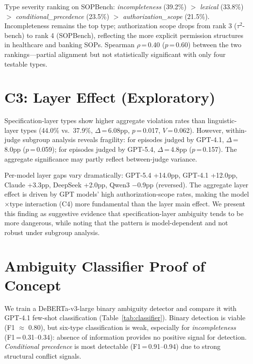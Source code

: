 \documentclass[11pt,a4paper]{article}
\begin{document}
Type severity ranking on SOPBench: \emph{incompleteness} (39.2\%) $>$ \emph{lexical} (33.8\%) $>$ \emph{conditional\_precedence} (23.5\%) $>$ \emph{authorization\_scope} (21.5\%).
Incompleteness remains the top type; authorization scope drops from rank 3 ($\tau^2$-bench) to rank 4 (SOPBench), reflecting the more explicit permission structures in healthcare and banking SOPs.
Spearman $\rho$\,=\,0.40 ($p$\,=\,0.60) between the two rankings---partial alignment but not statistically significant with only four testable types.

\section{C3: Layer Effect (Exploratory)}
\label{app:c3}

Specification-layer types show higher aggregate violation rates than linguistic-layer types (44.0\% vs.\ 37.9\%, $\Delta$\,=\,6.08pp, $p$\,=\,0.017, $V$\,=\,0.062).
However, within-judge subgroup analysis reveals fragility: for episodes judged by GPT-4.1, $\Delta$\,=\,8.0pp ($p$\,=\,0.059); for episodes judged by GPT-5.4, $\Delta$\,=\,4.8pp ($p$\,=\,0.157).
The aggregate significance may partly reflect between-judge variance.

Per-model layer gaps vary dramatically: GPT-5.4 +14.0pp, GPT-4.1 +12.0pp, Claude +3.3pp, DeepSeek +2.0pp, Qwen3 $-$0.9pp (reversed).
The aggregate layer effect is driven by GPT models' high authorization-scope rates, making the model$\times$type interaction (C4) more fundamental than the layer main effect.
We present this finding as suggestive evidence that specification-layer ambiguity tends to be more dangerous, while noting that the pattern is model-dependent and not robust under subgroup analysis.

\section{Ambiguity Classifier Proof of Concept}
\label{app:classifier}

We train a DeBERTa-v3-large binary ambiguity detector and compare it with GPT-4.1 few-shot classification (Table~\ref{tab:classifier}).
Binary detection is viable (F1 $\approx$ 0.80), but six-type classification is weak, especially for \emph{incompleteness} (F1\,=\,0.31--0.34): absence of information provides no positive signal for detection.
\emph{Conditional precedence} is most detectable (F1\,=\,0.91--0.94) due to strong structural conflict signals.
\end{document}

